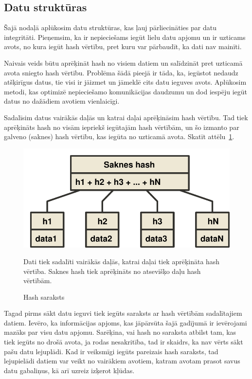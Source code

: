\subsection{Datu struktūras}
Šajā nodaļā aplūkosim datu struktūras, kas ļauj pārliecināties par datu integritāti. Pieņemsim, ka ir nepieciešams iegūt lielu datu apjomu un ir uzticams avots, no kura iegūt hash vērtību, pret kuru var pārbaudīt, ka dati nav mainīti. 

Naivais veids būtu aprēķināt hash no visiem datiem un salīdzināt pret uzticamā avota sniegto hash vērtību. Problēma šādā pieejā ir tāda, ka, iegūstot nedaudz atšķirīgus datus, tie visi ir jāizmet un jāmeklē cits datu ieguves avots. Aplūkosim metodi, kas optimizē nepieciešamo komunikācijas daudzumu un dod iespēju iegūt datus no dažādiem avotiem vienlaicīgi.

Sadalīsim datus vairākās daļās un katrai daļai aprēķināsim hash vērtību. Tad tiek aprēķināts hash no visām iepriekš iegūtajām hash vērtībām, un šo izmanto par galveno (saknes) hash vērtību, kas iegūta no uzticamā avota. Skatīt attēlu~\ref{fig:hash-list}.

\begin{figure}[htpb]
    \centering
    \includegraphics[scale=0.5]{teorija/hash-list.pdf}
    \caption{Hash saraksts}
    Dati tiek sadalīti vairākās daļās, katrai daļai tiek aprēķināta hash vērtība. Saknes hash tiek aprēķināts no atsevišķo daļu hash vērtībām.
\label{fig:hash-list}
\end{figure}

Tagad pirms sākt datu ieguvi tiek iegūts saraksts ar hash vērtībām sadalītajiem datiem. Ievēro, ka informācijas apjoms, kas jāpārsūta šajā gadījumā ir ievērojami mazāks par visu datu apjomu. Sarēķina, vai hash no saraksta atbilst tam, kas tiek iegūts no drošā avota, ja rodas nesakritība, tad ir skaidrs, ka nav vērts sākt pašu datu lejuplādi. Kad ir veiksmīgi iegūts pareizais hash saraksts, tad lejupielādi datiem var veikt no vairākiem avotiem, katram avotam prasot savus datu gabaliņus, kā arī uzreiz izķerot kļūdas.

